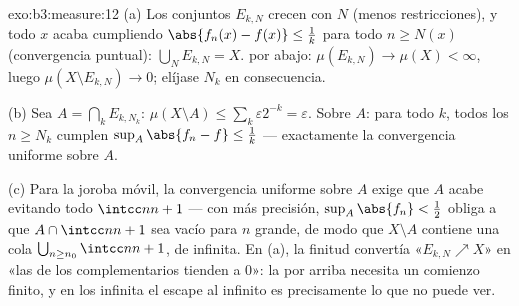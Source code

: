 \begin{solution}{exo:b3:measure:12}
(a) Los conjuntos $E_{k,N}$ crecen con $N$ (menos restricciones), y todo
$x$ acaba cumpliendo $\abs{f_n(x)
- f(x)} \leq \frac1k$ para todo $n \geq N(x)$ (convergencia puntual):
$\bigcup_NE_{k,N} = X$. 
por abajo: $\mu(E_{k,N}) \to \mu(X) < \infty$, luego $\mu(X\setminus
E_{k,N}) \to 0$; elíjase $N_k$ en consecuencia.

(b) Sea $A = \bigcap_kE_{k,N_k}$: $\mu(X\setminus A) \leq
\sum_k\varepsilon2^{-k} = \varepsilon$. Sobre $A$: para todo $k$, todos
los $n \geq N_k$ cumplen $\sup_A\abs{f_n - f} \leq
\frac1k$ --- exactamente la convergencia uniforme sobre $A$.

(c) Para la joroba móvil, la convergencia uniforme sobre $A$ exige que
$A$ acabe evitando todo $\intcc n{n+1}$ --- con más precisión,
$\sup_A\abs{f_n} < \frac12$ obliga a que $A \cap \intcc
n{n+1}$ sea vacío para $n$ grande, de modo que $X \setminus A$ contiene
una cola $\bigcup_{n\geq n_0}\intcc n{n+1}$, de
 infinita. En (a), la finitud
convertía «$E_{k,N}\nearrow X$» en «las
 de los complementarios tienden
a $0$»: la  por arriba
necesita un comienzo finito, y en los  infinita el escape al
infinito es precisamente lo que no puede ver.
\end{solution}

